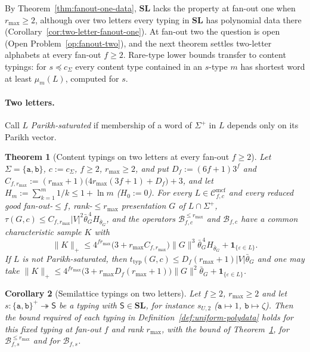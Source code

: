 \documentclass[11pt]{article}
\numberwithin{equation}{section}
\theoremstyle{plain}
\newtheorem{theorem}{Theorem}[section]
\newtheorem{corollary}[theorem]{Corollary}
\theoremstyle{definition}
\theoremstyle{remark}
\newcommand{\Cmcf}[2]{\mathcal{C}^{\mathrm{mcf}}_{#1,#2}}
\newcommand{\eps}{\varepsilon}
\theoremstyle{plain}
\begin{document}
By Theorem~\ref{thm:fanout-one-data}, $\mathbf{SL}$ lacks the property at
fan-out one when $r_{\max}\ge2$, although over two letters every typing in
$\mathbf{SL}$ has polynomial data there (Corollary~\ref{cor:two-letter-fanout-one}).
At fan-out two the question is open (Open Problem~\ref{op:fanout-two}), and the
next theorem settles two-letter alphabets at every fan-out $f\ge2$.  Rare-type lower bounds transfer to content
typings: for $s\preceq c_\Sigma$ every content type contained in an $s$-type $m$
has shortest word at least $\mu_m(L)$, computed for $s$.

\paragraph{Two letters.}
Call $L$ \emph{Parikh-saturated} if membership of a word of $\Sigma^+$ in $L$
depends only on its Parikh vector.

\begin{theorem}[Content typings on two letters at every fan-out $f\ge2$]
\label{thm:two-letter-content}
Let $\Sigma=\{\mathtt a,\mathtt b\}$, $c:=c_\Sigma$, $f\ge2$, $r_{\max}\ge2$, and put
$D_f:=(6f+1)3^f$ and
$C_{f,r_{\max}}:=(r_{\max}+1)\bigl(4r_{\max}(3f+1)+D_f\bigr)+3$, and let
$H_m:=\sum_{k=1}^m1/k\le1+\ln m$ \textup($H_0:=0$\textup).  For every
$L\in\Cmcf{f}{c}$ and every reduced good fan-out-$\le f$, rank-$\le r_{\max}$
presentation $G$ of $L\cap\Sigma^+$,
$\tau(G,c)\le C_{f,r_{\max}}|V|^2\bar\theta_G^{\,4}H_{\bar\theta_G}$, and the operators
$\mathcal B^{\le r_{\max}}_{f,c}$ and $\mathcal B_{f,c}$ have a common
characteristic sample $K$ with
\[
 \|K\|_+\le4^{fr_{\max}}\bigl(3+r_{\max}C_{f,r_{\max}}\bigr)\|G\|^3\bar\theta_G^{\,4}H_{\bar\theta_G}
 +\mathbf 1_{\{\eps\in L\}}.
\]
If $L$ is not Parikh-saturated, then
$t_{\mathrm{typ}}(G,c)\le D_f(r_{\max}+1)|V|\bar\theta_G$ and one may take
$\|K\|_+\le4^{fr_{\max}}\bigl(3+r_{\max}D_f(r_{\max}+1)\bigr)\|G\|^2\bar\theta_G
+\mathbf 1_{\{\eps\in L\}}$.
\end{theorem}

\begin{corollary}[Semilattice typings on two letters]
\label{cor:two-letter-semilattice}
Let $f\ge2$, $r_{\max}\ge2$ and let $s:\{\mathtt a,\mathtt b\}^+\twoheadrightarrow\mathsf S$ be a
typing with $\mathsf S\in\mathbf{SL}$, for instance $s_{U,2}$
\textup($\mathtt a\mapsto1$, $\mathtt b\mapsto\zeta$\textup).  Then the bound
required of each typing in Definition~\ref{def:uniform-polydata} holds for this
fixed typing at fan-out $f$ and rank $r_{\max}$, with the bound of
Theorem~\ref{thm:two-letter-content}, for
$\mathcal B^{\le r_{\max}}_{f,s}$ and for $\mathcal B_{f,s}$.
\end{corollary}
\end{document}
